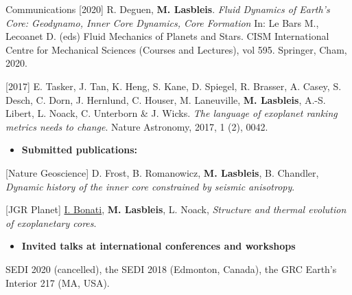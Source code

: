 \documentclass{cv}
\newcommand{\compresslist}{
	\setlength{\itemsep}{1pt}
	\setlength{\parskip}{0pt}
	\setlength{\parsep}{0pt}
}
\begin{document}
\begin{rubrique}{Communications}
[2020] R. Deguen, \textbf{M. Lasbleis}. \textit{Fluid Dynamics of Earth's Core: Geodynamo, Inner Core Dynamics, Core Formation} In: Le Bars M., Lecoanet D. (eds) Fluid Mechanics of Planets and Stars. CISM International Centre for Mechanical Sciences (Courses and Lectures), vol 595. Springer, Cham, 2020.

[2017] E. Tasker, J. Tan, K. Heng, S. Kane, D. Spiegel, R. Brasser, A. Casey, S. Desch, C. Dorn, J. Hernlund, C. Houser, M. Laneuville, \textbf{M. Lasbleis}, A.-S. Libert, L. Noack, C. Unterborn \& J. Wicks. \textit{The language of exoplanet ranking metrics needs to change}. Nature Astronomy, 2017, 1 (2), 0042.

\begin{itemize}\compresslist
	\item \textbf{Submitted publications:}
\end{itemize}
\vspace{-0.3cm}

[Nature Geoscience] D. Frost, B. Romanowicz, \textbf{M. Lasbleis}, B. Chandler, \textit{Dynamic history of the inner core constrained by seismic anisotropy}.

[JGR Planet] \underline{I. Bonati}, \textbf{M. Lasbleis}, L. Noack, \textit{Structure and thermal evolution of exoplanetary cores}.



\begin{itemize} \compresslist
	\item 	\textbf{Invited talks at international conferences and workshops}
\end{itemize}
\vspace{-0.3cm}

SEDI 2020 (cancelled), the SEDI 2018 (Edmonton, Canada), the GRC Earth's Interior 217 (MA, USA).



	


\end{rubrique}
\end{document}
